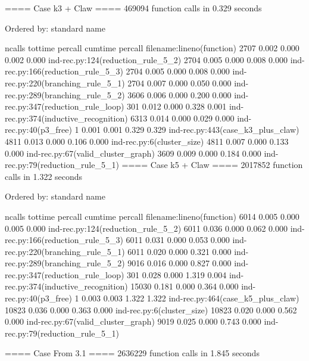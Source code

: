 \documentclass[11pt]{article}
\begin{document}
     ==== Case k3 + Claw ====
              469094 function calls in 0.329 seconds

        Ordered by: standard name

        ncalls  tottime  percall  cumtime  percall filename:lineno(function)
          2707    0.002    0.000    0.002    0.000 ind-rec.py:124(reduction_rule_5_2)
          2704    0.005    0.000    0.008    0.000 ind-rec.py:166(reduction_rule_5_3)
          2704    0.005    0.000    0.008    0.000 ind-rec.py:220(branching_rule_5_1)
          2704    0.007    0.000    0.050    0.000 ind-rec.py:289(branching_rule_5_2)
          3606    0.006    0.000    0.200    0.000 ind-rec.py:347(reduction_rule_loop)
           301    0.012    0.000    0.328    0.001 ind-rec.py:374(inductive_recognition)
          6313    0.014    0.000    0.029    0.000 ind-rec.py:40(p3_free)
             1    0.001    0.001    0.329    0.329 ind-rec.py:443(case_k3_plus_claw)
          4811    0.013    0.000    0.106    0.000 ind-rec.py:6(cluster_size)
          4811    0.007    0.000    0.133    0.000 ind-rec.py:67(valid_cluster_graph)
          3609    0.009    0.000    0.184    0.000 ind-rec.py:79(reduction_rule_5_1)
          ==== Case k5 + Claw ====
                   2017852 function calls in 1.322 seconds

             Ordered by: standard name

             ncalls  tottime  percall  cumtime  percall filename:lineno(function)
               6014    0.005    0.000    0.005    0.000 ind-rec.py:124(reduction_rule_5_2)
               6011    0.036    0.000    0.062    0.000 ind-rec.py:166(reduction_rule_5_3)
               6011    0.031    0.000    0.053    0.000 ind-rec.py:220(branching_rule_5_1)
               6011    0.020    0.000    0.321    0.000 ind-rec.py:289(branching_rule_5_2)
               9016    0.016    0.000    0.827    0.000 ind-rec.py:347(reduction_rule_loop)
                301    0.028    0.000    1.319    0.004 ind-rec.py:374(inductive_recognition)
              15030    0.181    0.000    0.364    0.000 ind-rec.py:40(p3_free)
                  1    0.003    0.003    1.322    1.322 ind-rec.py:464(case_k5_plus_claw)
              10823    0.036    0.000    0.363    0.000 ind-rec.py:6(cluster_size)
              10823    0.020    0.000    0.562    0.000 ind-rec.py:67(valid_cluster_graph)
               9019    0.025    0.000    0.743    0.000 ind-rec.py:79(reduction_rule_5_1)

               ==== Case From 3.1 ====
                        2636229 function calls in 1.845 seconds
\end{document}
